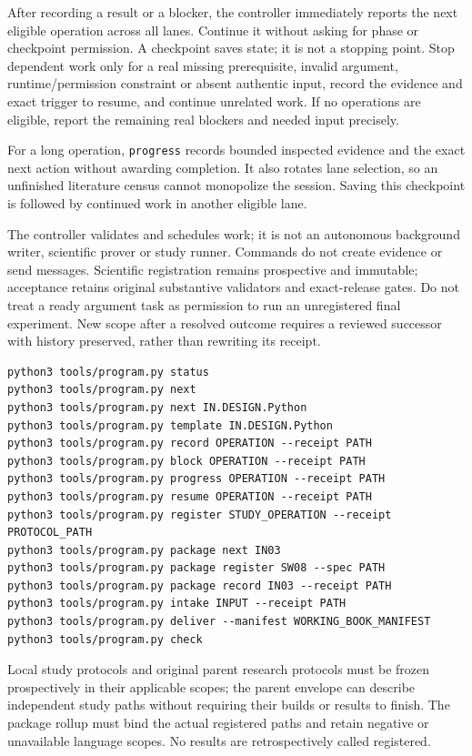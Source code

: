 \documentclass[
  10pt,
]{article}
\begin{document}
After recording a result or a blocker, the controller immediately
reports the next eligible operation across all lanes. Continue it
without asking for phase or checkpoint permission. A checkpoint saves
state; it is not a stopping point. Stop dependent work only for a real
missing prerequisite, invalid argument, runtime/permission constraint or
absent authentic input, record the evidence and exact trigger to resume,
and continue unrelated work. If no operations are eligible, report the
remaining real blockers and needed input precisely.

For a long operation, \texttt{progress} records bounded inspected
evidence and the exact next action without awarding completion. It also
rotates lane selection, so an unfinished literature census cannot
monopolize the session. Saving this checkpoint is followed by continued
work in another eligible lane.

The controller validates and schedules work; it is not an autonomous
background writer, scientific prover or study runner. Commands do not
create evidence or send messages. Scientific registration remains
prospective and immutable; acceptance retains original substantive
validators and exact-release gates. Do not treat a ready argument task
as permission to run an unregistered final experiment. New scope after a
resolved outcome requires a reviewed successor with history preserved,
rather than rewriting its receipt.

\begin{verbatim}
python3 tools/program.py status
python3 tools/program.py next
python3 tools/program.py next IN.DESIGN.Python
python3 tools/program.py template IN.DESIGN.Python
python3 tools/program.py record OPERATION --receipt PATH
python3 tools/program.py block OPERATION --receipt PATH
python3 tools/program.py progress OPERATION --receipt PATH
python3 tools/program.py resume OPERATION --receipt PATH
python3 tools/program.py register STUDY_OPERATION --receipt PROTOCOL_PATH
python3 tools/program.py package next IN03
python3 tools/program.py package register SW08 --spec PATH
python3 tools/program.py package record IN03 --receipt PATH
python3 tools/program.py intake INPUT --receipt PATH
python3 tools/program.py deliver --manifest WORKING_BOOK_MANIFEST
python3 tools/program.py check
\end{verbatim}

Local study protocols and original parent research protocols must be
frozen prospectively in their applicable scopes; the parent envelope can
describe independent study paths without requiring their builds or
results to finish. The package rollup must bind the actual registered
paths and retain negative or unavailable language scopes. No results are
retrospectively called registered.
\end{document}
